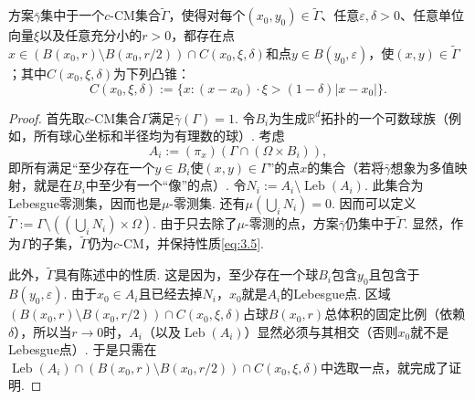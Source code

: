 \begin{lemma}\label{obj:3.22}
方案$\bar\gamma$集中于一个$c$-CM集合$\widetilde\Gamma$，使得对每个$(x_0,y_0)\in\widetilde\Gamma$、任意$\varepsilon,\delta>0$、任意单位向量$\xi$以及任意充分小的$r>0$，都存在点$x\in(B(x_0,r)\setminus B(x_0,r/2))\cap C(x_0,\xi,\delta)$和点$y\in B(y_0,\varepsilon)$，使$(x,y)\in\widetilde\Gamma$；其中$C(x_0,\xi,\delta)$为下列凸锥：
\[
C(x_0,\xi,\delta):=\{x:(x-x_0)\cdot\xi>(1-\delta)|x-x_0|\}.
\]
\end{lemma}
\begin{proof}
首先取$c$-CM集合$\Gamma$满足$\bar\gamma(\Gamma)=1$. 令$B_i$为生成$\mathbb R^d$拓扑的一个可数球族（例如，所有球心坐标和半径均为有理数的球）. 考虑
\[
A_i:=(\pi_x)(\Gamma\cap(\Omega\times B_i)),
\]
即所有满足“至少存在一个$y\in B_i$使$(x,y)\in\Gamma$”的点$x$的集合（若将$\bar\gamma$想象为多值映射，就是在$B_i$中至少有一个“像”的点）. 令$N_i:=A_i\setminus\operatorname{Leb}(A_i)$. 此集合为Lebesgue零测集，因而也是$\mu$-零测集. 还有$\mu(\bigcup_iN_i)=0$. 因而可以定义$\widetilde\Gamma:=\Gamma\setminus((\bigcup_iN_i)\times\Omega)$. 由于只去除了$\mu$-零测的点，方案$\bar\gamma$仍集中于$\widetilde\Gamma$. 显然，作为$\Gamma$的子集，$\widetilde\Gamma$仍为$c$-CM，并保持性质\eqref{eq:3.5}.

此外，$\widetilde\Gamma$具有陈述中的性质. 这是因为，至少存在一个球$B_i$包含$y_0$且包含于$B(y_0,\varepsilon)$. 由于$x_0\in A_i$且已经去掉$N_i$，$x_0$就是$A_i$的Lebesgue点. 区域$(B(x_0,r)\setminus B(x_0,r/2))\cap C(x_0,\xi,\delta)$占球$B(x_0,r)$总体积的固定比例（依赖$\delta$），所以当$r\to0$时，$A_i$（以及$\operatorname{Leb}(A_i)$）显然必须与其相交（否则$x_0$就不是Lebesgue点）. 于是只需在$\operatorname{Leb}(A_i)\cap(B(x_0,r)\setminus B(x_0,r/2))\cap C(x_0,\xi,\delta)$中选取一点，就完成了证明.
\end{proof}

